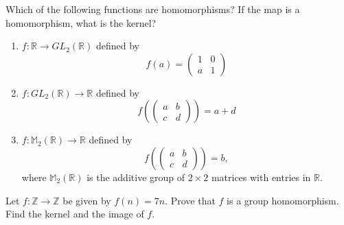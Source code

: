 \begin{exercise}
Which of the following functions are homomorphisms? If the map is a
homomorphism, what is the kernel? 
\begin{enumerate}
 
 
\item
$f : {\mathbb R} \rightarrow GL_2 ( {\mathbb R})$ defined by
\[
f( a ) =
\left(
\begin{array}{cc}
1 & 0 \\
a & 1
\end{array}
\right)
\]
 
\item
$f : GL_2 ({\mathbb R})   \rightarrow {\mathbb R}$ defined by
\[
f
\left(
\left(
\begin{array}{cc}
a & b \\
c & d
\end{array}
\right)
\right)
= a + d
\]
 
 
\item
$f : {\mathbb M}_2( {\mathbb R})   \rightarrow {\mathbb R}$ defined by
\[
f
\left(
\left(
\begin{array}{cc}
a & b \\
c & d
\end{array}
\right)
\right)
= b,
\]
where ${\mathbb M}_2( {\mathbb R})$ is the additive group of $2 \times
2$ matrices with entries in ${\mathbb R}$.
 
\end{enumerate}
\end{exercise}

\begin{exercise}
Let $f : {\mathbb Z} \rightarrow {\mathbb Z}$ be given by $f(n) = 7n$.
Prove that $f$ is a group homomorphism. Find the kernel and the
image of $f$.
\end{exercise} 
 
